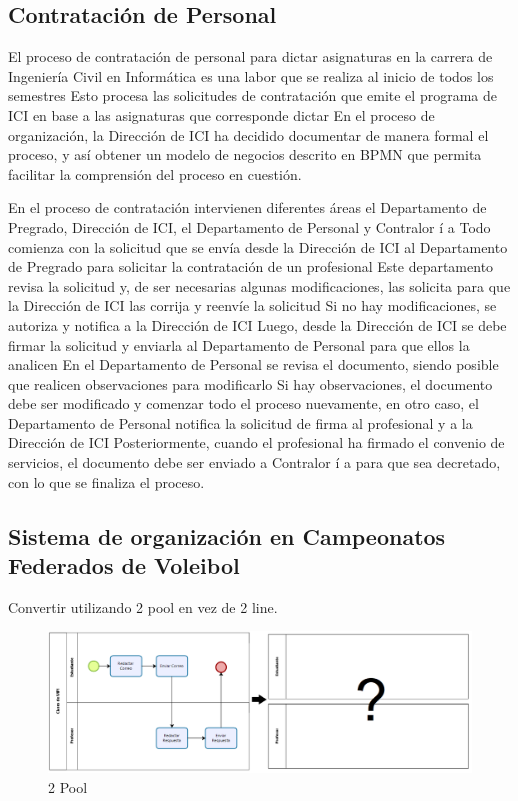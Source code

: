 \documentclass[12pt,letterpaper]{article}
\begin{document}
\subsection{\textbf{Contratación de Personal}}	
El proceso de contratación de personal para dictar asignaturas en la carrera de Ingeniería Civil en Informática es una labor que se realiza al inicio de todos los semestres Esto procesa las solicitudes de contratación que emite el programa de ICI en base a las asignaturas que corresponde dictar En el proceso de organización, la Dirección de ICI ha decidido documentar de manera formal el proceso, y así obtener un modelo de negocios descrito en BPMN que permita facilitar la comprensión del proceso en cuestión.
\par En el proceso de contratación intervienen diferentes áreas el Departamento de Pregrado, Dirección de ICI, el Departamento de Personal y Contralor í a Todo comienza con la solicitud que se envía desde la Dirección de ICI al Departamento de Pregrado para solicitar la contratación de un profesional Este departamento revisa la solicitud y, de ser necesarias algunas modificaciones, las solicita para que la Dirección de ICI las corrija y reenvíe la solicitud Si no hay modificaciones, se autoriza y notifica a la Dirección de ICI Luego, desde la Dirección de ICI se debe firmar la solicitud y enviarla al Departamento de Personal para que ellos la analicen En el Departamento de Personal se revisa el documento, siendo posible que realicen observaciones para modificarlo Si hay observaciones, el documento debe ser modificado y comenzar todo el proceso nuevamente, en otro caso, el Departamento de Personal notifica la solicitud de firma al profesional y a la Dirección de ICI Posteriormente, cuando el profesional ha firmado el convenio de servicios, el documento debe ser enviado a Contralor í a para que sea decretado, con lo que se finaliza el proceso.\\




	\subsection{\textbf{Sistema de organización en Campeonatos Federados de Voleibol}}	
	Convertir utilizando 2 pool en vez de 2 line.
	
	\begin{figure}[H]
		\centering
		\includegraphics[scale=0.25]{img/2pool.PNG}     
		\caption{2 Pool }
	\label{fig:rc}
	\end{figure}
\end{document}
